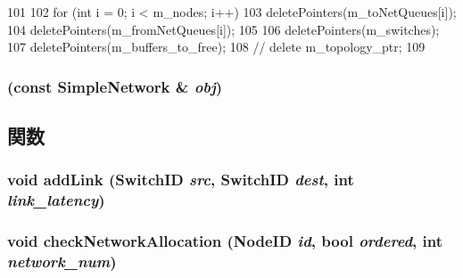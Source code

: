 \begin{DoxyCode}
101 {
102     for (int i = 0; i < m_nodes; i++) {
103         deletePointers(m_toNetQueues[i]);
104         deletePointers(m_fromNetQueues[i]);
105     }
106     deletePointers(m_switches);
107     deletePointers(m_buffers_to_free);
108     // delete m_topology_ptr;
109 }
\end{DoxyCode}
\hypertarget{classSimpleNetwork_a4c77599a6ef119fb4a2c8b388dffabe0}{
\subsubsection[{SimpleNetwork}]{ (const {\bf SimpleNetwork} \& {\em obj})}}
\label{classSimpleNetwork_a4c77599a6ef119fb4a2c8b388dffabe0}


\subsection{関数}
\hypertarget{classSimpleNetwork_a62004334638177e52a711f5dd2f2d1a1}{
\subsubsection[{addLink}]{\setlength{\rightskip}{0pt plus 5cm}void addLink ({\bf SwitchID} {\em src}, \/  {\bf SwitchID} {\em dest}, \/  int {\em link\_\-latency})}}
\label{classSimpleNetwork_a62004334638177e52a711f5dd2f2d1a1}
\hypertarget{classSimpleNetwork_a6536f357a006b030ddba64fbe086b608}{
\subsubsection[{checkNetworkAllocation}]{\setlength{\rightskip}{0pt plus 5cm}void checkNetworkAllocation ({\bf NodeID} {\em id}, \/  bool {\em ordered}, \/  int {\em network\_\-num})}}
\label{classSimpleNetwork_a6536f357a006b030ddba64fbe086b608}



